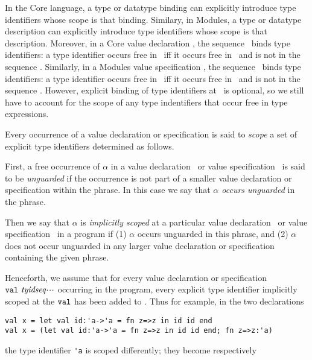 
In the Core language, a type or datatype binding can explicitly
introduce type identifiers whose scope is that binding.
Similary, in Modules, a type or datatype description can explicitly
introduce type identifiers whose scope is that description.
Moreover, in a
Core value declaration  \valdec,
 the sequence \tyidseq\ binds
type identifiers: a type identifier occurs free in \valdec\
iff it occurs free in \valbind\ and is not in the sequence
\tyidseq.
Similarly, in a Modules value specification \valspec,  
the sequence \tyidseq\ binds
type identifiers: a type identifier occurs free in \valspec\
iff it occurs free in \valdesc\ and is not in the sequence
\tyidseq.
However,\index{23.11} explicit binding of type identifiers at \ is
optional, so we still have to account for the scope of any
type indentifiers that occur free in type expressions.

Every occurrence of a value declaration or specification is said to {\sl scope} a set of explicit type identifiers determined as follows.

First, a free occurrence of $\alpha$ in a value declaration
\valdec\ or value specification \valspec\  is said to be {\sl unguarded} if the occurrence is not part
of a smaller value declaration or specification within the phrase.
In this case we say that {\sl $\alpha$ occurs unguarded} in the phrase.

Then we say that $\alpha$ is {\sl implicitly  scoped} at a particular value
declaration \valdec\ or value specification \valspec\
in a program if (1) $\alpha$ occurs
unguarded in this phrase, and (2) $\alpha$ does not occur
unguarded in any larger value declaration or specification containing the given phrase.
\label{scope-def-lab}

Henceforth, we assume that for every value declaration or specification
 ${\tt val}\ {\it tyidseq}\mbox{$\cdot\!\cdot\!\cdot$}$
 occurring in the program, every explicit type identifier implicitly scoped at the 
${\tt val}$ has been added to \tyidseq . Thus for example, in the two declarations

\begin{verbatim}
val x = let val id:'a->'a = fn z=>z in id id end 
val x = (let val id:'a->'a = fn z=>z in id id end; fn z=>z:'a)
\end{verbatim}
the type identifier \verb+'a+ is scoped differently; they become respectively

